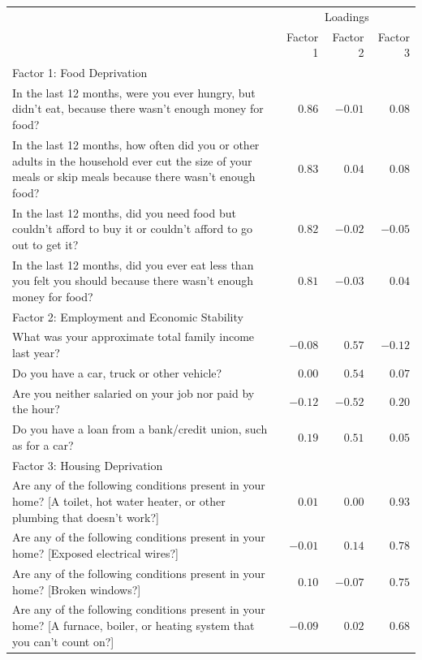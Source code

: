\documentclass[
]{report}
\begin{document}
\begin{table}

\caption{\label{tbl-exp1-pca}Results from a Factor Analysis of our
deprivation questionnaire}\begin{minipage}[t]{\linewidth}

{\centering 

\begin{longtable}{lrrr}
\tabularnewline

\toprule
 & \multicolumn{3}{c}{Loadings} \\ 
\cmidrule(lr){2-4}
 & Factor 1 & Factor 2 & Factor 3 \\ 
\midrule
\multicolumn{4}{l}{Factor 1: Food Deprivation} \\ 
\midrule
In the last 12 months, were you ever hungry, but didn't eat, because there wasn't enough money for food? & $0.86$ & $-0.01$ & $0.08$ \\ 
In the last 12 months, how often did you or other adults in the household ever cut the size of your 
meals or skip meals because there wasn't enough food? & $0.83$ & $0.04$ & $0.08$ \\ 
In the last 12 months, did you need food but couldn't afford to buy it or couldn't afford to go out to get it? & $0.82$ & $-0.02$ & $-0.05$ \\ 
In the last 12 months, did you ever eat less than you felt you should because there wasn't 
enough money for food? & $0.81$ & $-0.03$ & $0.04$ \\ 
\midrule
\multicolumn{4}{l}{Factor 2: Employment and Economic Stability} \\ 
\midrule
What was your approximate total family income last year? & $-0.08$ & $0.57$ & $-0.12$ \\ 
Do you have a car, truck or other vehicle? & $0.00$ & $0.54$ & $0.07$ \\ 
Are you neither salaried on your job nor paid by the hour? & $-0.12$ & $-0.52$ & $0.20$ \\ 
Do you have a loan from a bank/credit union, such as for a car? & $0.19$ & $0.51$ & $0.05$ \\ 
\midrule
\multicolumn{4}{l}{Factor 3: Housing Deprivation} \\ 
\midrule
Are any of the following conditions present in your home? [A toilet, hot water heater, or other plumbing that doesn't work?] & $0.01$ & $0.00$ & $0.93$ \\ 
Are any of the following conditions present in your home? [Exposed electrical wires?] & $-0.01$ & $0.14$ & $0.78$ \\ 
Are any of the following conditions present in your home? [Broken windows?] & $0.10$ & $-0.07$ & $0.75$ \\ 
Are any of the following conditions present in your home? [A furnace, boiler, or heating system that you can't count on?] & $-0.09$ & $0.02$ & $0.68$ \\ 
\bottomrule
\end{longtable}

}
\end{minipage}
\end{table}
\end{document}
